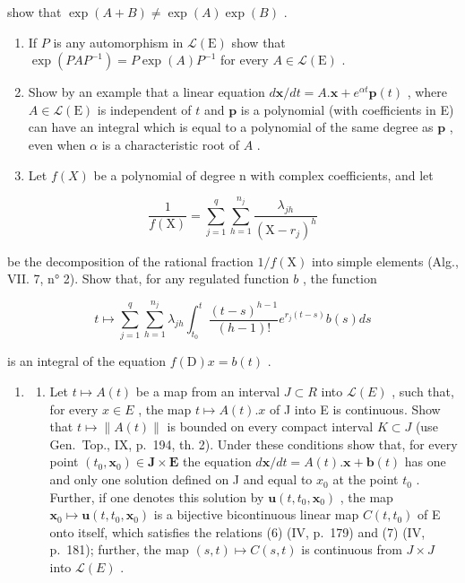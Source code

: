 show that \(\exp(A+B)\neq\exp(A)\exp(B)\) .

\begin{enumerate}
\def\labelenumi{\arabic{enumi})}
\setcounter{enumi}{3}
\item
  If \(P\) is any automorphism in \(\mathcal{L}(\mathrm{E})\) show that \(\exp(PAP^{-1}) = P\exp(A)P^{-1}\) for every \(A \in \mathcal{L}(\mathrm{E})\) .
\item
  Show by an example that a linear equation \(d\mathbf{x} / dt = A.\mathbf{x} + e^{\alpha t}\mathbf{p}(t)\) , where \(A \in \mathcal{L}(\mathrm{E})\) is independent of \(t\) and \(\mathbf{p}\) is a polynomial (with coefficients in E) can have an integral which is equal to a polynomial of the same degree as \(\mathbf{p}\) , even when \(\alpha\) is a characteristic root of \(A\) .
\item
  Let \(f(X)\) be a polynomial of degree n with complex coefficients, and let
\end{enumerate}

\[
\frac {1}{f (\mathrm{X})} = \sum_ {j = 1} ^ {q} \sum_ {h = 1} ^ {n _ {j}} \frac {\lambda_ {j h}}{(\mathrm{X} - r _ {j}) ^ {h}}
\]

be the decomposition of the rational fraction \(1 / f(\mathrm{X})\) into simple elements (Alg., VII. 7, n° 2). Show that, for any regulated function \(b\) , the function

\[
t \mapsto \sum_ {j = 1} ^ {q} \sum_ {h = 1} ^ {n _ {j}} \lambda_ {j h} \int_ {t _ {0}} ^ {t} \frac {(t - s) ^ {h - 1}}{(h - 1) !} e ^ {r _ {j} (t - s)} b (s) d s
\]

is an integral of the equation \(f(\mathrm{D})x = b(t)\) .

\begin{enumerate}
\def\labelenumi{\arabic{enumi})}
\setcounter{enumi}{6}
\tightlist
\item
  \begin{enumerate}
  \def\labelenumii{\alph{enumii})}
  \tightlist
  \item
    Let \(t \mapsto A(t)\) be a map from an interval \(J \subset R\) into \(\mathcal{L}(E)\) , such that, for every \(x \in E\) , the map \(t \mapsto A(t).x\) of J into E is continuous. Show that \(t \mapsto \|A(t)\|\) is bounded on every compact interval \(K \subset J\) (use Gen.~Top., IX, p.~194, th. 2). Under these conditions show that, for every point \((t_{0}, \mathbf{x}_{0}) \in \mathbf{J} \times \mathbf{E}\) the equation \(d\mathbf{x}/dt = A(t).\mathbf{x} + \mathbf{b}(t)\) has one and only one solution defined on J and equal to \(x_{0}\) at the point \(t_{0}\) . Further, if one denotes this solution by \(\mathbf{u}(t, t_{0}, \mathbf{x}_{0})\) , the map \(\mathbf{x}_{0} \mapsto \mathbf{u}(t, t_{0}, \mathbf{x}_{0})\) is a bijective bicontinuous linear map \(C(t, t_{0})\) of E onto itself, which satisfies the relations (6) (IV, p.~179) and (7) (IV, p.~181); further, the map \((s, t) \mapsto C(s, t)\) is continuous from \(J \times J\) into \(\mathcal{L}(E)\) .
  \end{enumerate}
\end{enumerate}

